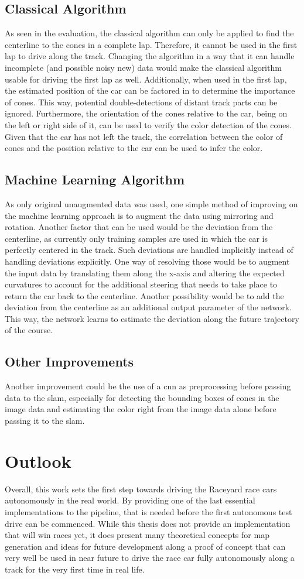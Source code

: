\subsection{Classical Algorithm}
As seen in the evaluation, the classical algorithm can only be applied to find the centerline to the cones in a complete lap. Therefore, it cannot be used in the first lap to drive along the track. Changing the algorithm in a way that it can handle incomplete (and possible noisy new) data would make the classical algorithm usable for driving the first lap as well.
Additionally, when used in the first lap, the estimated position of the car can be factored in to determine the importance of cones. This way, potential double-detections of distant track parts can be ignored. Furthermore, the orientation of the cones relative to the car, being on the left or right side of it, can be used to verify the color detection of the cones. Given that the car has not left the track, the correlation between the color of cones and the position relative to the car can be used to infer the color.
\subsection{Machine Learning Algorithm}
As  only original unaugmented data was used, one simple method of improving on the machine learning approach is to augment the data using mirroring and rotation. Another factor that can be used would be the deviation from the centerline, as currently only training samples are used in which the car is perfectly centered in the track. Such deviations are handled implicitly instead of handling deviations explicitly. One way of resolving those would be to augment the input data by translating them along the x-axis and altering the expected curvatures to account for the additional steering that needs to take place to return the car back to the centerline. Another possibility would be to add the deviation from the centerline as an additional output parameter of the network. This way, the network learns to estimate the deviation along the future trajectory of the course.
\subsection{Other Improvements}
Another improvement could be the use of a \ac{cnn} as preprocessing before passing data to the \ac{slam}, especially for detecting the bounding boxes of cones in the image data and estimating the color right from the image data alone before passing it to the \ac{slam}.
\section{Outlook}
Overall, this work sets the first step towards driving the Raceyard race cars autonomously in the real world. By providing one of the last essential implementations to the pipeline, that is needed before the first autonomous test drive can be commenced. While this thesis does not provide an implementation that will win races yet, it does present many theoretical concepts for map generation and ideas for future development along a proof of concept that can very well be used in near future to drive the race car fully autonomously along a track for the very first time in real life.